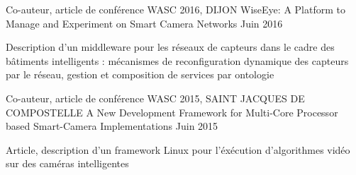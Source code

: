 \begin{cventries}
  \cventry
    {Co-auteur, article de conférence WASC 2016, DIJON} %
    {WiseEye: A Platform to Manage and Experiment on Smart Camera Networks} %
    {} %
    {Juin 2016} %
    {
      \begin{cvitems} %
        \item {Description d'un middleware pour les réseaux de capteurs dans le cadre des bâtiments intelligents : mécanismes de reconfiguration dynamique des capteurs par le réseau, gestion et composition de services par ontologie}
      \end{cvitems}
    }

  \cventry
    {Co-auteur, article de conférence WASC 2015, SAINT JACQUES DE COMPOSTELLE} %
    {A New Development Framework for Multi-Core Processor based Smart-Camera Implementations} %
    {} %
    {Juin 2015} %
    {
      \begin{cvitems} %
        \item {Article, description d'un framework Linux pour l'éxécution d'algorithmes vidéo sur des caméras intelligentes}
      \end{cvitems}
    }

\end{cventries}
